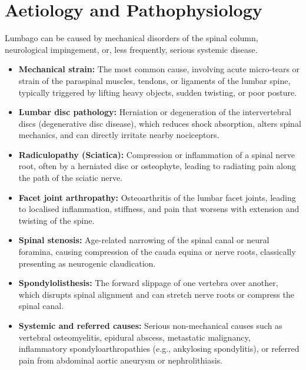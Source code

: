 \section*{Aetiology and Pathophysiology}
Lumbago can be caused by mechanical disorders of the spinal column, neurological impingement, or, less frequently, serious systemic disease.
\begin{itemize}
    \item \textbf{Mechanical strain:} The most common cause, involving acute micro-tears or strain of the paraspinal muscles, tendons, or ligaments of the lumbar spine, typically triggered by lifting heavy objects, sudden twisting, or poor posture.
    \item \textbf{Lumbar disc pathology:} Herniation or degeneration of the intervertebral discs (degenerative disc disease), which reduces shock absorption, alters spinal mechanics, and can directly irritate nearby nociceptors.
    \item \textbf{Radiculopathy (Sciatica):} Compression or inflammation of a spinal nerve root, often by a herniated disc or osteophyte, leading to radiating pain along the path of the sciatic nerve.
    \item \textbf{Facet joint arthropathy:} Osteoarthritis of the lumbar facet joints, leading to localised inflammation, stiffness, and pain that worsens with extension and twisting of the spine.
    \item \textbf{Spinal stenosis:} Age-related narrowing of the spinal canal or neural foramina, causing compression of the cauda equina or nerve roots, classically presenting as neurogenic claudication.
    \item \textbf{Spondylolisthesis:} The forward slippage of one vertebra over another, which disrupts spinal alignment and can stretch nerve roots or compress the spinal canal.
    \item \textbf{Systemic and referred causes:} Serious non-mechanical causes such as vertebral osteomyelitis, epidural abscess, metastatic malignancy, inflammatory spondyloarthropathies (e.g., ankylosing spondylitis), or referred pain from abdominal aortic aneurysm or nephrolithiasis.
\end{itemize}

